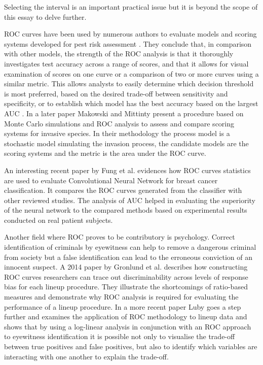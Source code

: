 \documentclass[a4paper,justified]{tufte-handout}
\begin{document}
\begin{fullwidth}

\noindent Selecting the interval is an important practical issue but it is beyond the scope of this essay to delve further.

\vspace{3mm}
\noindent ROC curves have been used by numerous authors to evaluate models and scoring systems developed for pest risk assessment \citep{copp2009screening,heidy2010minfneginvspec}. They conclude that, in comparison with other models, the strength of the ROC analysis is that it thoroughly investigates test accuracy across a range of scores, and that it allows for visual examination of scores on one curve or a comparison of two or more curves using a similar metric. This allows analysts to easily determine which decision threshold is most preferred, based on the desired trade-off between sensitivity and specificity, or to establish which model has the best accuracy based on the largest AUC \citep{linden2006diagpreddismgmt}. In a later paper Makowski and Mittinty \citep{makowski2010scorsysinvpests} present a procedure based on Monte Carlo simulations and ROC analysis to assess and compare scoring systems for invasive species. In their methodology the process model is a stochastic model simulating the invasion process, the candidate models are the scoring systems and the metric is the area under the ROC curve.

\vspace{3mm}
\noindent An interesting recent paper by Fung et al. \citep{fung2018cnnbcancerclass} evidences how ROC curves statistics are used to evaluate Convolutional Neural Network for breast cancer classification. It compares the ROC curves generated from the classifier with other reviewed studies. The analysis of AUC helped in evaluating the superiority of the neural network to the compared methods based on experimental results conducted on real patient subjects.

\vspace{3mm}
\noindent Another field where ROC proves to be contributory is psychology. Correct identification of criminals by eyewitness can help to remove a dangerous criminal from society but a false identification can lead to the erroneous conviction of an innocent suspect. A 2014 paper by Gronlund et al. \citep{gronlund2014eyewitness} describes how constructing ROC curves researchers can trace out discriminability across levels of response bias for each lineup procedure. They illustrate the shortcomings of ratio-based measures and demonstrate why ROC analysis is required for evaluating the performance of a lineup procedure. In a more recent paper Luby \citep{luby2017lineup} goes a step further and examines the application of ROC methodology to lineup data and shows that by using a log-linear analysis in conjunction with an ROC approach to eyewitness identification it is possible not only to visualise the trade-off between true positives and false positives, but also to identify which variables are interacting with one another to explain the trade-off.


\end{fullwidth}
\end{document}
